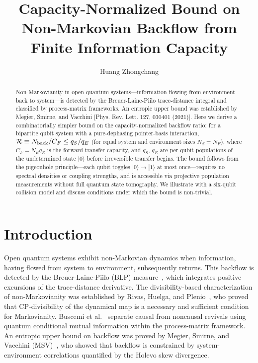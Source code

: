 \documentclass[aps,prl,twocolumn,superscriptaddress,hyperref]{revtex4-2}
\begin{document}
\title{Capacity-Normalized Bound on Non-Markovian Backflow from Finite Information Capacity}

\author{Huang Zhongchang}

\begin{abstract}
Non-Markovianity in open quantum systems---information flowing from environment back to system---is detected by the Breuer-Laine-Piilo trace-distance integral and classified by process-matrix frameworks. An entropic upper bound was established by Megier, Smirne, and Vacchini [Phys. Rev. Lett. 127, 030401 (2021)]. Here we derive a combinatorially simpler bound on the capacity-normalized backflow ratio: for a bipartite qubit system with a pure-dephasing pointer-basis interaction, $\mathcal{R} \equiv N_{\rm back}/C_F \leq q_S/q_E$ (for equal system and environment sizes $N_S=N_E$), where $C_F = N_E q_E$ is the forward transfer capacity, and $q_S$, $q_E$ are per-qubit populations of the undetermined state $|0\rangle$ before irreversible transfer begins. The bound follows from the pigeonhole principle---each qubit toggles $|0\rangle \to |1\rangle$ at most once---requires no spectral densities or coupling strengths, and is accessible via projective population measurements without full quantum state tomography. We illustrate with a six-qubit collision model and discuss conditions under which the bound is non-trivial.
\end{abstract}

\maketitle

\section{Introduction}

Open quantum systems exhibit non-Markovian dynamics when information, having flowed from system to environment, subsequently returns. This backflow is detected by the Breuer-Laine-Piilo (BLP) measure~\cite{Breuer:2009}, which integrates positive excursions of the trace-distance derivative. The divisibility-based characterization of non-Markovianity was established by Rivas, Huelga, and Plenio~\cite{Rivas:2010}, who proved that CP-divisibility of the dynamical map is a necessary and sufficient condition for Markovianity. Buscemi et al.~\cite{Buscemi:2025} separate causal from noncausal revivals using quantum conditional mutual information within the process-matrix framework. An entropic upper bound on backflow was proved by Megier, Smirne, and Vacchini (MSV)~\cite{Megier:2021}, who showed that backflow is constrained by system-environment correlations quantified by the Holevo skew divergence.
\end{document}
